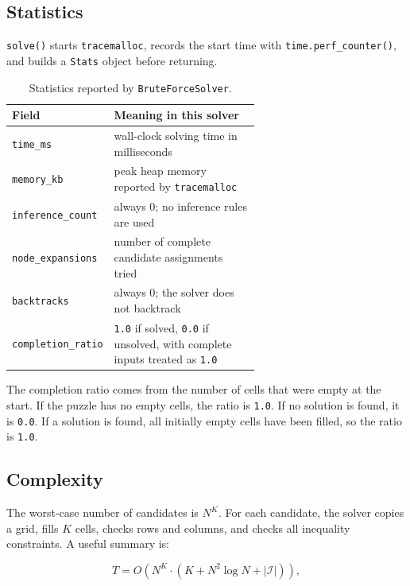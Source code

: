 \subsection{Statistics}

\texttt{solve()} starts \texttt{tracemalloc}, records the start time with
\texttt{time.perf\_counter()}, and builds a \texttt{Stats} object before
returning.

\begin{table}[h]
  \centering
  \caption{Statistics reported by \texttt{BruteForceSolver}.}
  \label{tab:bf_stats}
  \begin{tabular}{lp{0.62\linewidth}}
    \toprule
    Field & Meaning in this solver \\
    \midrule
    \texttt{time\_ms} & wall-clock solving time in milliseconds \\
    \texttt{memory\_kb} & peak heap memory reported by \texttt{tracemalloc} \\
    \texttt{inference\_count} & always 0; no inference rules are used \\
    \texttt{node\_expansions} & number of complete candidate assignments tried \\
    \texttt{backtracks} & always 0; the solver does not backtrack \\
    \texttt{completion\_ratio} & \texttt{1.0} if solved, \texttt{0.0} if unsolved, with complete inputs treated as \texttt{1.0} \\
    \bottomrule
  \end{tabular}
\end{table}

The completion ratio comes from the number of cells that were empty at the
start. If the puzzle has no empty cells, the ratio is \texttt{1.0}. If no
solution is found, it is \texttt{0.0}. If a solution is found, all initially
empty cells have been filled, so the ratio is \texttt{1.0}.

\subsection{Complexity}

The worst-case number of candidates is $N^K$. For each candidate, the solver
copies a grid, fills $K$ cells, checks rows and columns, and checks all
inequality constraints. A useful summary is:

\begin{equation}
  T = O\!\left(N^{K} \cdot (K + N^{2}\log N + |\mathcal{I}|)\right),
\end{equation}

